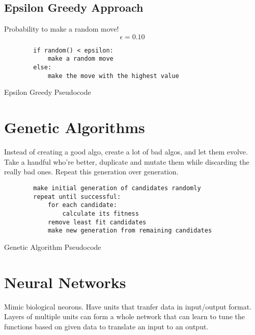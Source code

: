 \subsection{Epsilon Greedy Approach}
Probability to make a random move!
\begin{equation*}
	\epsilon = 0.10
\end{equation*}

\begin{code}
	\begin{verbatim}
		if random() < epsilon:
			make a random move
		else:
			make the move with the highest value
	\end{verbatim}
	\caption{Epsilon Greedy Pseudocode}
\end{code}

\section{Genetic Algorithms}
Instead of creating a good algo, create a lot of bad algos, and let them evolve.
Take a handful who're better, duplicate and mutate them while discarding the
really bad ones. Repeat this generation over generation.

\begin{code}
	\begin{verbatim}
		make initial generation of candidates randomly
		repeat until successful:
			for each candidate:
				calculate its fitness
			remove least fit candidates
			make new generation from remaining candidates
	\end{verbatim}
	\caption{Genetic Algorithm Pseudocode}
\end{code}

\section{Neural Networks}
Mimic biological neorons. Have units that tranfer data in input/output format.
Layers of multiple units can form a whole network that can learn to tune
the functions based on given data to translate an input to an output.

